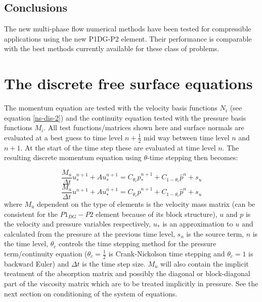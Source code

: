 \subsection{Conclusions}
The new multi-phase flow numerical methods have been
tested for compressible applications using the
new P1DG-P2 element. Their performance
is comparable with the best methods currently available
for these class of problems.




\vfill\eject



\section{The discrete free surface equations}
\noindent The momentum equation are tested with the velocity
basis functions $N_i$ (see equation \ref{ns-dis-2}) and the continuity equation tested
with the pressure basis functions $M_i$. All test functions/matrices
shown here and surface normals are evaluated at a best guess to
time level $n+\frac{1}{2}$ mid way
between time level $n$ and $n+1$. At the start of the time
step these are evaluated at time level $n$.
The resulting discrete momentum equation using $\theta$-time stepping then becomes:

\begin{equation}
\frac{M_u}{\Delta t}u_*^{n+1}+Au_*^{n+1}=  C_{\theta_c} {\hat p}_*^{n+1}
+C_{1-\theta_c} {\hat p}^n+s_u
\label{eq1}
\end{equation}
\begin{equation}
\frac{M_u}{\Delta t}u^{n+1}+Au_*^{n+1}=C_{\theta_c} {\hat p}^{n+1}
+C_{1-\theta_c} {\hat p}^n+s_u
\label{eq2}
\end{equation}
where $M_u$ dependent on the type of elements is the velocity mass matrix (can be consistent
for the $P1_{DG}-P2$ element because of its block structure),
$u$ and $p$ is the velocity and pressure variables respectively,
$u_*$ is an approximation to $u$ and calculated from the
pressure at the previous time level,
$s_u$ is the source term, $n$ is the time level, $\theta_c$ controls
the time stepping method for the pressure term/continuity equation
($\theta_c=\frac{1}{2}$ is Crank-Nickolson time stepping and
$\theta_c=1$ is backward Euler)
and $\Delta t$ is the time step size. $M_u$ will also contain the
implicit treatment of the absorption matrix and possibly the diagonal or block-diagonal
part of
the viscosity matrix which are to be treated implicitly in pressure. See
the next section on conditioning of the system of equations.

